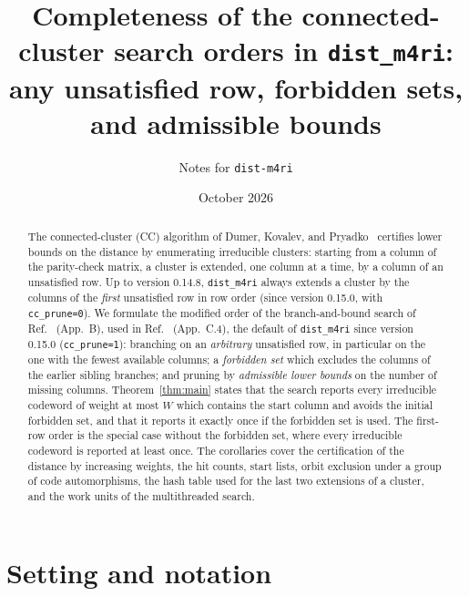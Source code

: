 \documentclass[11pt]{article}
\theoremstyle{definition}
\newcommand{\ttt}[1]{\texttt{#1}}
\begin{document}
\title{Completeness of the connected-cluster search orders in \ttt{dist\_m4ri}:\\
any unsatisfied row, forbidden sets, and admissible bounds}
\author{Notes for \ttt{dist-m4ri}}
\date{October 2026}
\maketitle

\begin{abstract}
The connected-cluster (CC) algorithm of Dumer, Kovalev, and Pryadko~\cite{DKP17} certifies lower bounds on the
distance by enumerating irreducible clusters: starting from a column of the parity-check matrix, a cluster is extended,
one column at a time, by a column of an unsatisfied row. Up to version 0.14.8, \ttt{dist\_m4ri} always extends a
cluster by the columns of the \emph{first} unsatisfied row in row order (since version 0.15.0, with
\ttt{cc\_prune=0}). We formulate the modified order of the
branch-and-bound search of Ref.~\cite{LOMKZ26} (App.~B), used in Ref.~\cite{Lee26} (App.~C.4), the default of
\ttt{dist\_m4ri} since version 0.15.0 (\ttt{cc\_prune=1}): branching on an
\emph{arbitrary} unsatisfied row, in particular on the one with the fewest available columns; a \emph{forbidden set}
which excludes the columns of the earlier sibling branches; and pruning by \emph{admissible lower bounds} on the number
of missing columns. Theorem~\ref{thm:main} states that the search reports every irreducible codeword of weight at most
$W$ which contains the start column and avoids the initial forbidden set, and that it reports it exactly once if the
forbidden set is used. The first-row order is the special case without the forbidden set, where every irreducible
codeword is reported at least once. The corollaries cover the certification of the distance by increasing weights, the
hit counts, start lists, orbit exclusion under a group of code automorphisms, the hash table used for the last two
extensions of a cluster, and the work units of the multithreaded search.
\end{abstract}

\section{Setting and notation}\label{sec:setting}
\end{document}

